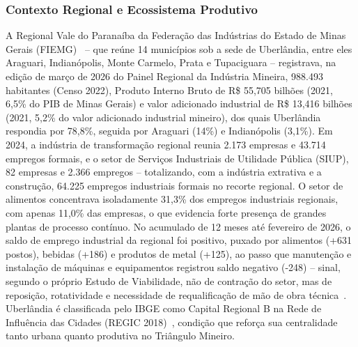 \subsubsection{Contexto Regional e Ecossistema Produtivo}

A Regional Vale do Paranaíba da Federação das Indústrias do Estado de Minas Gerais (FIEMG)~\cite{fiemg_painel_vale_paranaiba_2026} -- que reúne 14 municípios sob a sede de Uberlândia, entre eles Araguari, Indianópolis, Monte Carmelo, Prata e Tupaciguara -- registrava, na edição de março de 2026 do Painel Regional da Indústria Mineira, 988.493 habitantes (Censo 2022), Produto Interno Bruto de R\$ 55,705 bilhões (2021, 6,5\% do PIB de Minas Gerais) e valor adicionado industrial de R\$ 13,416 bilhões (2021, 5,2\% do valor adicionado industrial mineiro), dos quais Uberlândia respondia por 78,8\%, seguida por Araguari (14\%) e Indianópolis (3,1\%). Em 2024, a indústria de transformação regional reunia 2.173 empresas e 43.714 empregos formais, e o setor de Serviços Industriais de Utilidade Pública (SIUP), 82 empresas e 2.366 empregos -- totalizando, com a indústria extrativa e a construção, 64.225 empregos industriais formais no recorte regional. O setor de alimentos concentrava isoladamente 31,3\% dos empregos industriais regionais, com apenas 11,0\% das empresas, o que evidencia forte presença de grandes plantas de processo contínuo. No acumulado de 12 meses até fevereiro de 2026, o saldo de emprego industrial da regional foi positivo, puxado por alimentos (+631 postos), bebidas (+186) e produtos de metal (+125), ao passo que manutenção e instalação de máquinas e equipamentos registrou saldo negativo (-248) -- sinal, segundo o próprio Estudo de Viabilidade, não de contração do setor, mas de reposição, rotatividade e necessidade de requalificação de mão de obra técnica~\cite{fiemg_painel_vale_paranaiba_2026,ufu_estudo_viabilidade_cst_2026}. Uberlândia é classificada pelo IBGE como Capital Regional B na Rede de Influência das Cidades (REGIC 2018)~\cite{ibge_regic_2018_uberlandia}, condição que reforça sua centralidade tanto urbana quanto produtiva no Triângulo Mineiro.

